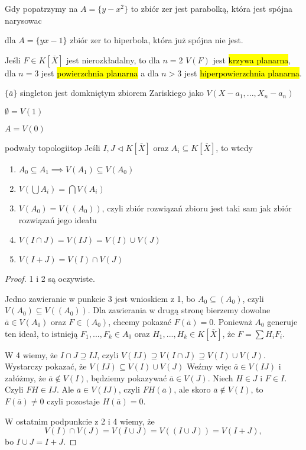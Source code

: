 \begin{example}[m]
  \item Gdy popatrzymy na $A=\{y-x^2\}$ to zbiór zer jest parabolką, która jest spójna {\large\color{red}narysowac}
  \item dla $A=\{yx-1\}$ zbiór zer to hiperbola, która już spójna nie jest.
  \item Jeśli $F\in K[\overline{X}]$ jest nierozkładalny, to dla $n=2$ $V(F)$ jest \hl{krzywa planarna}, dla $n=3$ jest \hl{powierzchnia planarna} a dla $n>3$ jest \hl{hiperpowierzchnia planarna}.
  \item $\{\overline{a}\}$ singleton jest domkniętym zbiorem Zariskiego jako $V(X-a_1,..., X_n-a_n)$
  \item $\emptyset=V(1)$
  \item $A=V(0)$
\end{example}

\begin{lemma}{podwały topologii}{top}
  Jeśli $I,J\triangleleft K[\overline{X}]$ oraz $A_i\subseteq K[\overline{X}]$, to wtedy 
  \begin{enumerate}
    \item $A_0\subseteq A_1\implies V(A_1)\subseteq V(A_0)$
    \item $V(\bigcup A_i)=\bigcap V(A_i)$
    \item $V(A_0)=V((A_0))$, czyli zbiór rozwiązań zbioru jest taki sam jak zbiór rozwiązań jego ideału
    \item $V(I\cap J)=V(IJ)=V(I)\cup V(J)$
    \item $V(I+J)=V(I)\cap V(J)$
  \end{enumerate}
\end{lemma}

\begin{proof}
  1 i 2 są oczywiste. 
  
  Jedno zawieranie w punkcie 3 jest wnioskiem z 1, bo $A_0\subseteq (A_0)$, czyli $V(A_0)\subseteq V((A_0))$. Dla zawierania w drugą stronę bierzemy dowolne $\overline{a}\in V(A_0)$ oraz $F\in (A_0)$, chcemy pokazać $F(\overline{a})=0$. Ponieważ $A_0$ generuje ten ideał, to istnieją $F_1,..., F_k\in A_0$ oraz $H_1,..., H_k\in K[\overline{X}]$, że $F=\sum H_iF_i$.

  W 4 wiemy, że $I\cap J\supseteq IJ$, czyli $V(IJ)\supseteq V(I\cap J)\supseteq V(I)\cup V(J)$. Wystarczy pokazać, że $V(IJ)\subseteq V(I)\cup V(J)$ Weźmy więc $\overline{a}\in V(IJ)$ i załóżmy, że $\overline{a}\notin V(I)$, będziemy pokazywać $\overline{a}\in V(J)$. Niech $H\in J$ i $F\in I$. Czyli $FH\in IJ$. Ale $\overline{a}\in V(IJ)$, czyli $FH(\overline{a})$, ale skoro $\overline{a}\notin V(I)$, to $F(\overline{a})\neq 0$ czyli pozostaje $H(\overline{a})=0$.

  W ostatnim podpunkcie z 2 i 4 wiemy, że 
  $$V(I)\cap V(J)=V(I\cup J)=V((I\cup J))=V(I+J),$$
  bo $I\cup J=I+J$.
\end{proof}

